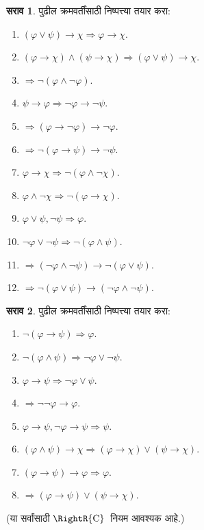 \documentclass[11pt,a4paper,openany]{book}
\theoremstyle{definition}
\newtheorem{prob}{सराव}[chapter]
\newcommand{\lif}{\mathbin{\to}}
\newcommand{\Sequent}{\Rightarrow}
\newcommand{\Contraction}{\ensuremath{\mathrm{C}}}
\begin{document}
\begin{prob}
पुढील क्रमवर्तींसाठी निष्पत्त्या तयार करा:
\begin{enumerate}
\item $(\varphi \lor \psi) \lif \chi \Sequent \varphi \lif \chi$.
\item $(\varphi \lif \chi) \land (\psi \lif \chi) \Sequent (\varphi \lor \psi) \lif \chi$.
\item $\Sequent \lnot(\varphi \land \lnot \varphi)$.
\item $\psi \lif \varphi \Sequent \lnot \varphi \lif \lnot \psi$.
\item $\Sequent (\varphi \lif \lnot \varphi) \lif \lnot \varphi$.
\item $\Sequent \lnot(\varphi \lif \psi) \lif \lnot \psi$.
\item $\varphi \lif \chi \Sequent \lnot (\varphi \land \lnot \chi)$.
\item $\varphi \land \lnot \chi \Sequent \lnot (\varphi \lif \chi)$.
\item $\varphi \lor \psi, \lnot \psi \Sequent \varphi$.
\item $\lnot \varphi \lor \lnot \psi \Sequent \lnot(\varphi \land \psi)$.
\item $\Sequent (\lnot \varphi \land \lnot \psi) \lif\lnot(\varphi \lor \psi)$.
\item $\Sequent \lnot(\varphi \lor \psi) \lif (\lnot \varphi \land \lnot \psi)$.
\end{enumerate}
\end{prob}

\begin{prob}
पुढील क्रमवर्तींसाठी निष्पत्त्या तयार करा:
\begin{enumerate}
\item $\lnot(\varphi \lif \psi) \Sequent \varphi$.
\item $\lnot(\varphi \land \psi) \Sequent \lnot \varphi \lor \lnot \psi$.
\item $\varphi \lif \psi \Sequent \lnot \varphi \lor \psi$.
\item $\Sequent \lnot \lnot \varphi \lif \varphi$.
\item $\varphi \lif \psi, \lnot \varphi \lif \psi \Sequent \psi$.
\item $(\varphi \land \psi) \lif \chi \Sequent (\varphi \lif \chi) \lor (\psi \lif \chi)$.
\item $(\varphi \lif \psi) \lif \varphi \Sequent \varphi$.
\item $\Sequent (\varphi \lif \psi) \lor (\psi \lif \chi)$.
\end{enumerate}
(या सर्वांसाठी $\RightR{\Contraction}$~नियम आवश्यक आहे.)
\end{prob}
\end{document}
